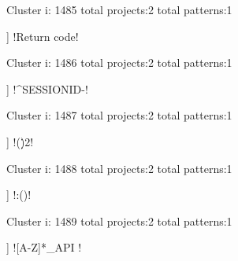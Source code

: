 Cluster i: 1485
total projects:2
total patterns:1
\begin{multicols}{1}
\begin{description}[noitemsep,topsep=0pt]
\item [[2] ] \cverb!Return code!
\end{description}
\end{multicols}







Cluster i: 1486
total projects:2
total patterns:1
\begin{multicols}{1}
\begin{description}[noitemsep,topsep=0pt]
\item [[2] ] \cverb!^SESSIONID-!
\end{description}
\end{multicols}







Cluster i: 1487
total projects:2
total patterns:1
\begin{multicols}{1}
\begin{description}[noitemsep,topsep=0pt]
\item [[2] ] \cverb!(\d\.){2}!
\end{description}
\end{multicols}







Cluster i: 1488
total projects:2
total patterns:1
\begin{multicols}{1}
\begin{description}[noitemsep,topsep=0pt]
\item [[2] ] \cverb!:(\s*)!
\end{description}
\end{multicols}







Cluster i: 1489
total projects:2
total patterns:1
\begin{multicols}{1}
\begin{description}[noitemsep,topsep=0pt]
\item [[2] ] \cverb![A-Z]*_API !
\end{description}
\end{multicols}







